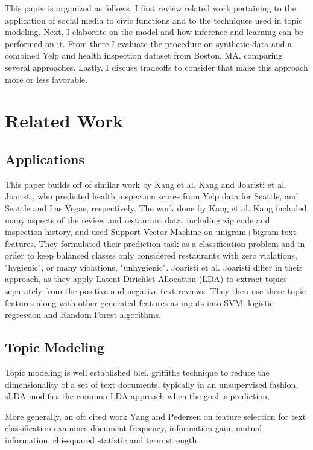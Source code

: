 \documentclass{article}
\begin{document}
This paper is organized as follows. I first review related work pertaining to the application of social media to civic functions and to the techniques used in topic modeling. Next, I elaborate on the model and how inference and learning can be performed on it. From there I evaluate the procedure on synthetic data and a combined Yelp and health inspection dataset from Boston, MA, comparing several approaches. Lastly, I discuss tradeoffs to consider that make this approach more or less favorable.

\section{Related Work}

\subsection{Applications}

This paper builds off of similar work by Kang et al. {Kang} and Joaristi et al. {Joaristi}, who predicted health inspection scores from Yelp data for Seattle, and Seattle and Las Vegas, respectively. The work done by Kang et al. {Kang} included many aspects of the review and restaurant data, including zip code and inspection history, and used Support Vector Machine on unigram+bigram text features. They formulated their prediction task as a classification problem and in order to keep balanced classes only considered restaurants with zero violations, "hygienic", or many violations, "unhygienic". Joaristi et al. {Joaristi} differ in their approach, as they apply Latent Dirichlet Allocation (LDA) to extract topics separately from the positive and negative text reviews. They then use these topic features along with other generated features as inputs into SVM, logistic regression and Random Forest algorithms.


\subsection{Topic Modeling}
Topic modeling is well established {blei, griffiths} technique to reduce the dimensionality of a set of text documents, typically in an unsupervised fashion. sLDA modifies the common LDA approach when the goal is prediction, 


More generally, an oft cited work {Yang and Pedersen} on feature selection for text classification examines document frequency, information gain, mutual information, chi-squared statistic and term strength. 
\end{document}
